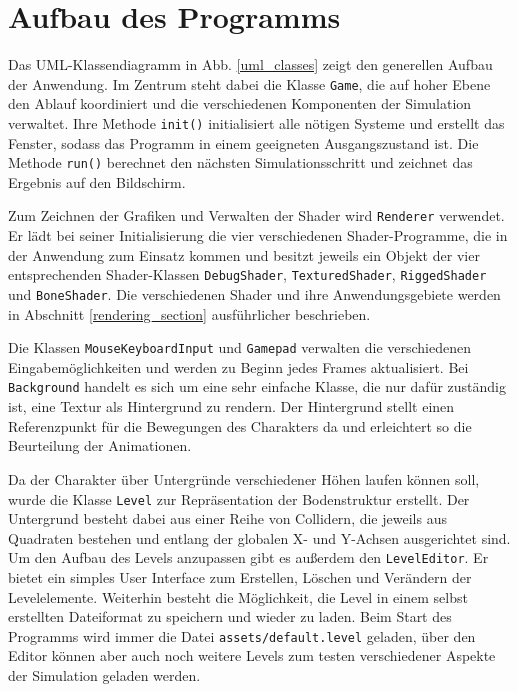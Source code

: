 \section{Aufbau des Programms} \label{aufbau}
Das UML-Klassendiagramm in Abb. \ref{uml_classes} zeigt den generellen Aufbau der Anwendung. Im Zentrum steht dabei die Klasse \lstinline{Game}, die auf hoher Ebene den Ablauf koordiniert und die verschiedenen Komponenten der Simulation verwaltet. Ihre Methode \lstinline{init()} initialisiert alle nötigen Systeme und erstellt das Fenster, sodass das Programm in einem geeigneten Ausgangszustand ist. Die Methode \lstinline{run()} berechnet den nächsten Simulationsschritt und zeichnet das Ergebnis auf den Bildschirm.

Zum Zeichnen der Grafiken und Verwalten der Shader wird \lstinline{Renderer} verwendet. Er lädt bei seiner Initialisierung die vier verschiedenen Shader-Programme, die in der Anwendung zum Einsatz kommen und besitzt jeweils ein Objekt der vier entsprechenden Shader-Klassen \lstinline{DebugShader}, \lstinline{TexturedShader}, \lstinline{RiggedShader} und \lstinline{BoneShader}. Die verschiedenen Shader und ihre Anwendungsgebiete werden in Abschnitt \ref{rendering_section} ausführlicher beschrieben.

Die Klassen \lstinline {MouseKeyboardInput} und \lstinline{Gamepad} verwalten die verschiedenen Eingabemöglichkeiten und werden zu Beginn jedes Frames aktualisiert. Bei \lstinline{Background} handelt es sich um eine sehr einfache Klasse, die nur dafür zuständig ist, eine Textur als Hintergrund zu rendern. Der Hintergrund stellt einen Referenzpunkt für die Bewegungen des Charakters da und erleichtert so die Beurteilung der Animationen.

Da der Charakter über Untergründe verschiedener Höhen laufen können soll, wurde die Klasse \lstinline{Level} zur Repräsentation der Bodenstruktur erstellt. Der Untergrund besteht dabei aus einer Reihe von Collidern, die jeweils aus Quadraten bestehen und entlang der globalen X- und Y-Achsen ausgerichtet sind. Um den Aufbau des Levels anzupassen gibt es außerdem den \lstinline{LevelEditor}. Er bietet ein simples User Interface zum Erstellen, Löschen und Verändern der Levelelemente. Weiterhin besteht die Möglichkeit, die Level in einem selbst erstellten Dateiformat zu speichern und wieder zu laden. Beim Start des Programms wird immer die Datei \lstinline{assets/default.level} geladen, über den Editor können aber auch noch weitere Levels zum testen verschiedener Aspekte der Simulation geladen werden.

